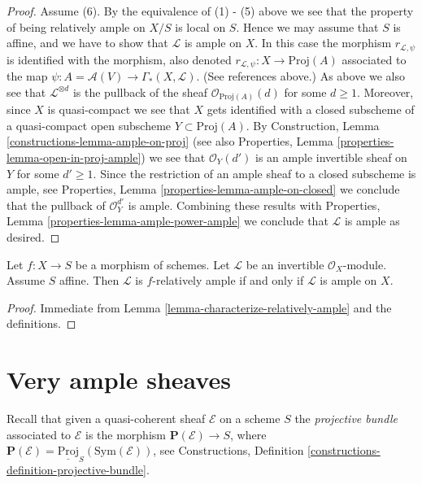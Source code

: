 \begin{proof}
\medskip\noindent
Assume (6). By the equivalence of (1) - (5) above we see that the
property of being relatively ample on $X/S$ is local on $S$. Hence
we may assume that $S$ is affine, and we have to show that
$\mathcal{L}$ is ample on $X$. In this case the morphism
$r_{\mathcal{L}, \psi}$ is identified with the morphism, also denoted
$r_{\mathcal{L}, \psi} : X \to \text{Proj}(A)$ associated to the map
$\psi : A = \mathcal{A}(V) \to \Gamma_*(X, \mathcal{L})$.
(See references above.) As above we also see that
$\mathcal{L}^{\otimes d}$ is the pullback of the sheaf
$\mathcal{O}_{\text{Proj}(A)}(d)$ for some $d \geq 1$.
Moreover, since $X$ is quasi-compact we
see that $X$ gets identified with a closed subscheme of a
quasi-compact open subscheme $Y \subset \text{Proj}(A)$.
By Construction, Lemma \ref{constructions-lemma-ample-on-proj}
(see also
Properties, Lemma \ref{properties-lemma-open-in-proj-ample})
we see that $\mathcal{O}_Y(d')$ is an ample invertible sheaf on
$Y$ for some $d' \geq 1$. Since the restriction of an ample
sheaf to a closed subscheme is ample, see
Properties, Lemma \ref{properties-lemma-ample-on-closed}
we conclude that the pullback of
$\mathcal{O}_Y^{d'}$ is ample. Combining these results with
Properties, Lemma \ref{properties-lemma-ample-power-ample}
we conclude that $\mathcal{L}$ is ample as desired.
\end{proof}

\begin{lemma}
\label{lemma-ample-over-affine}
Let $f : X \to S$ be a morphism of schemes.
Let $\mathcal{L}$ be an invertible $\mathcal{O}_X$-module.
Assume $S$ affine.
Then $\mathcal{L}$ is $f$-relatively ample if and only
if $\mathcal{L}$ is ample on $X$.
\end{lemma}

\begin{proof}
Immediate from Lemma \ref{lemma-characterize-relatively-ample}
and the definitions.
\end{proof}











\section{Very ample sheaves}
\label{section-very-ample}

\noindent
Recall that given a quasi-coherent sheaf $\mathcal{E}$ on a scheme
$S$ the {\it projective bundle} associated to $\mathcal{E}$ is the morphism
$\mathbf{P}(\mathcal{E}) \to S$, where
$\mathbf{P}(\mathcal{E}) = \underline{\text{Proj}}_S(\text{Sym}(\mathcal{E}))$,
see
Constructions, Definition \ref{constructions-definition-projective-bundle}.

